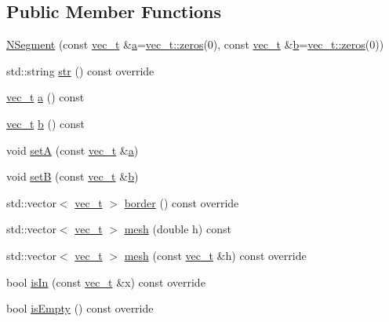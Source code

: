 \subsection*{Public Member Functions}
\begin{DoxyCompactItemize}
\item 
\mbox{\hyperlink{class_n_segment_a15b93ff64168dac284abf4144148b194}{N\+Segment}} (const \mbox{\hyperlink{_n_vector_8h_a0a2cfc67e738a3d73e4f12098c4c07f6}{vec\+\_\+t}} \&\mbox{\hyperlink{class_n_segment_a7a4eccaa9a0746ef758efdde1bfbbd65}{a}}=\mbox{\hyperlink{class_n_vector_a6253cef3c39dd9d388bbf7d17069bc51}{vec\+\_\+t\+::zeros}}(0), const \mbox{\hyperlink{_n_vector_8h_a0a2cfc67e738a3d73e4f12098c4c07f6}{vec\+\_\+t}} \&\mbox{\hyperlink{class_n_segment_aa782c4870899db28cae39616edc86967}{b}}=\mbox{\hyperlink{class_n_vector_a6253cef3c39dd9d388bbf7d17069bc51}{vec\+\_\+t\+::zeros}}(0))
\item 
std\+::string \mbox{\hyperlink{class_n_segment_a15514dec8420dd1aafda38e7327c9be0}{str}} () const override
\item 
\mbox{\hyperlink{_n_vector_8h_a0a2cfc67e738a3d73e4f12098c4c07f6}{vec\+\_\+t}} \mbox{\hyperlink{class_n_segment_a7a4eccaa9a0746ef758efdde1bfbbd65}{a}} () const
\item 
\mbox{\hyperlink{_n_vector_8h_a0a2cfc67e738a3d73e4f12098c4c07f6}{vec\+\_\+t}} \mbox{\hyperlink{class_n_segment_aa782c4870899db28cae39616edc86967}{b}} () const
\item 
void \mbox{\hyperlink{class_n_segment_a423242ff6d7d28acbf6bb0fffb559163}{setA}} (const \mbox{\hyperlink{_n_vector_8h_a0a2cfc67e738a3d73e4f12098c4c07f6}{vec\+\_\+t}} \&\mbox{\hyperlink{class_n_segment_a7a4eccaa9a0746ef758efdde1bfbbd65}{a}})
\item 
void \mbox{\hyperlink{class_n_segment_a02094cbbe46d7c647299ecdde05ce592}{setB}} (const \mbox{\hyperlink{_n_vector_8h_a0a2cfc67e738a3d73e4f12098c4c07f6}{vec\+\_\+t}} \&\mbox{\hyperlink{class_n_segment_aa782c4870899db28cae39616edc86967}{b}})
\item 
std\+::vector$<$ \mbox{\hyperlink{_n_vector_8h_a0a2cfc67e738a3d73e4f12098c4c07f6}{vec\+\_\+t}} $>$ \mbox{\hyperlink{class_n_segment_a0ef102ed1c0751ae4a9a2e52bf0736da}{border}} () const override
\item 
std\+::vector$<$ \mbox{\hyperlink{_n_vector_8h_a0a2cfc67e738a3d73e4f12098c4c07f6}{vec\+\_\+t}} $>$ \mbox{\hyperlink{class_n_segment_a49473aeaa477736a7863e60607e045e0}{mesh}} (double h) const
\item 
std\+::vector$<$ \mbox{\hyperlink{_n_vector_8h_a0a2cfc67e738a3d73e4f12098c4c07f6}{vec\+\_\+t}} $>$ \mbox{\hyperlink{class_n_segment_ad89a4122b800b15f465f5ca776394721}{mesh}} (const \mbox{\hyperlink{_n_vector_8h_a0a2cfc67e738a3d73e4f12098c4c07f6}{vec\+\_\+t}} \&h) const override
\item 
bool \mbox{\hyperlink{class_n_segment_a9370351370e57d265f990b3e9d2ab114}{is\+In}} (const \mbox{\hyperlink{_n_vector_8h_a0a2cfc67e738a3d73e4f12098c4c07f6}{vec\+\_\+t}} \&x) const override
\item 
bool \mbox{\hyperlink{class_n_segment_ac17e9542c20477269bbcf08286d79d07}{is\+Empty}} () const override
\end{DoxyCompactItemize}
